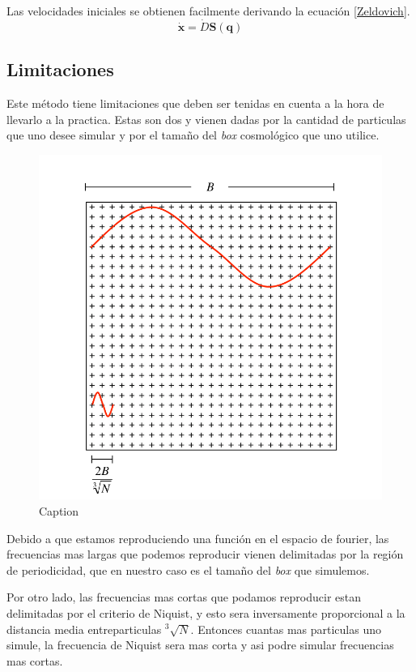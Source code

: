 Las velocidades iniciales se obtienen facilmente derivando la ecuaci\'on \ref{Zeldovich}.
\begin{equation}
    \dot{\textbf{x}}=\dot{D}\textbf{S}(\textbf{q})
\end{equation}{}

\subsection{Limitaciones}
\label{Limitaciones}
Este m\'etodo tiene limitaciones que deben ser tenidas en cuenta a la hora de llevarlo a la practica. Estas son dos y vienen dadas por la cantidad de particulas que uno desee simular y por el tama\~no del \textit{box} cosmol\'ogico que uno utilice.

\begin{figure}
    \centering
    \includegraphics[width=12cm]{Figures/Captura de pantalla de 2019-10-02 17-37-57.png}
    \caption{Caption}
    \label{fig:my_label}
\end{figure}{}

Debido a que estamos reproduciendo una funci\'on en el espacio de fourier, las frecuencias mas largas que podemos reproducir vienen delimitadas por la regi\'on de periodicidad, que en nuestro caso es el tama\~no del \textit{box} que simulemos. 

Por otro lado, las frecuencias mas cortas que podamos reproducir estan delimitadas por el criterio de Niquist, y esto sera inversamente proporcional a la distancia media entreparticulas $^{3}\sqrt{N}$. Entonces cuantas mas particulas uno simule, la frecuencia de Niquist sera mas corta y asi podre simular frecuencias mas cortas. 


